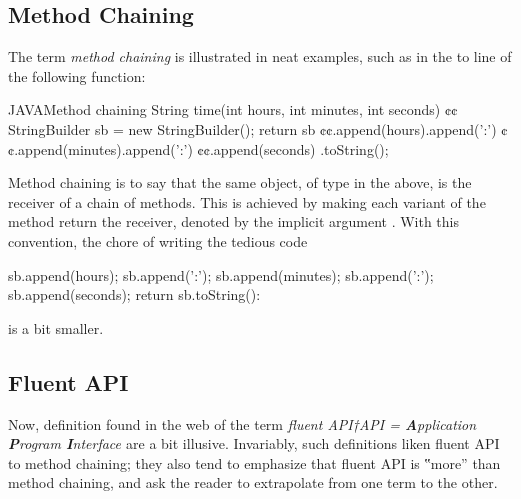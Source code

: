 \subsection{Method Chaining}
The term \emph{method chaining} is illustrated in neat examples, such
as in the  to  line of the following \Java function:
\begin{Code}{JAVA}{Method chaining}
String time(int hours, int minutes, int seconds) {¢¢
  StringBuilder sb = new StringBuilder();
  return sb
    ¢¢.append(hours).append(':')
    ¢¢.append(minutes).append(':')
    ¢¢.append(seconds)
    .toString();
}
\end{Code}
Method chaining is to say that the same object,  of type  in the above,
   is the receiver of a chain of methods.
This is achieved by making each variant of the method  return the receiver, denoted by the
  implicit argument .
With this convention, the chore of writing the tedious code
\begin{JAVA}
sb.append(hours);
sb.append(':');
sb.append(minutes);
sb.append(':');
sb.append(seconds);
return sb.toString():
\end{JAVA}
is a bit smaller.

\subsection{Fluent API}
Now, definition found in the web of the term \emph{fluent API†{API =
    \textbf Application \textbf Program \textbf Interface
}} are a bit illusive.
Invariably, such definitions liken fluent API to method chaining;
  they also tend to emphasize that fluent API is ‟more” than method
  chaining, and ask the reader to extrapolate from one term to the other.

